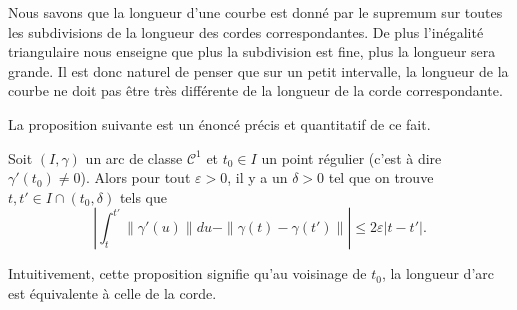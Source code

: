 Nous savons que la longueur d'une courbe est donné par le supremum sur toutes les subdivisions de la longueur des cordes correspondantes. De plus l'inégalité triangulaire nous enseigne que plus la subdivision est fine, plus la longueur sera grande. Il est donc naturel de penser que sur un petit intervalle, la longueur de la courbe ne doit pas être très différente de la longueur de la corde correspondante.

La proposition suivante est un énoncé précis et quantitatif de ce fait.
\begin{proposition}
    Soit $(I,\gamma)$ un arc de classe $\mathcal{C}^1$ et $t_0\in I$ un point régulier (c'est à dire $\gamma'(t_0)\neq 0$). Alors pour tout $\varepsilon>0$, il y a un $\delta>0$ tel que on trouve  $t,t'\in I\cap(t_0,\delta)$ tels que
    \begin{equation}
        \left| \int_t^{t'}\| \gamma'(u) \|du-\| \gamma(t)-\gamma(t') \| \right| \leq 2\varepsilon| t-t' |.
    \end{equation}
\end{proposition}
Intuitivement, cette proposition signifie qu'au voisinage de $t_0$, la longueur d'arc est équivalente à celle de la corde.

